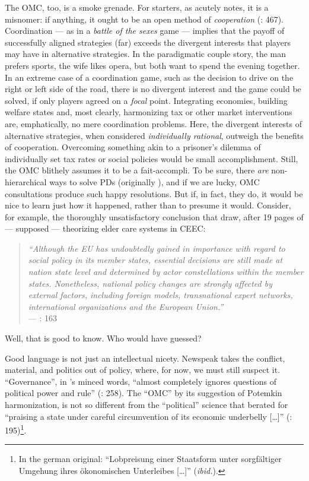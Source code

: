 \documentclass[11pt,a4paper,oneside,openright]{article}
\begin{document}
The \gls{OMC}, too, is a smoke grenade. For starters, as \citeauthor{Offe2003} acutely notes, it is a misnomer: if anything, it ought to be an open method of \emph{cooperation} (\citeyear{Offe2003}: 467). Coordination --- as in a \emph{battle of the sexes} game --- implies that the payoff of successfully aligned strategies (far) exceeds the divergent interests that players may have in alternative strategies. In the paradigmatic couple story, the man prefers sports, the wife likes opera, but both want to spend the evening together. In an extreme case of a coordination game, such as the decision to drive on the right or left side of the road, there is no divergent interest and the game could be solved, if only players agreed on a \emph{focal} point. Integrating economies, building welfare states and, most clearly, harmonizing tax or other market interventions are, emphatically, no mere coordination problems. Here, the divergent interests of alternative strategies, when considered \emph{individually rational}, outweigh the benefits of cooperation. Overcoming something akin to a prisoner's dilemma of individually set tax rates or social policies would be small accomplishment. Still, the \gls{OMC} blithely assumes it to be a fait-accompli. To be sure, there \emph{are} non-hierarchical ways to solve \glspl{PD} (originally \citealt{Axelrod1980}), and if we are lucky, \gls{OMC} consultations produce such happy resolutions. But if, in fact, they do, it would be nice to learn just how it happened, rather than to presume it would. 
Consider, for example, the thoroughly unsatisfactory conclusion that \citeauthor{Theobald2009} draw, after 19 pages of --- supposed --- theorizing elder care systems in \gls{CEEC}:
\begin{quote}
	\emph{``Although the EU has undoubtedly gained in importance with regard to social policy in its member states, essential decisions are still made at nation­ state level and determined by actor constellations within the member states. Nonetheless, national policy changes are strongly affected by external factors, including foreign models, transnational expert networks, international organizations and the European Union.''}\\
	--- \citeyear{Theobald2009}: 163
\end{quote}
Well, that is good to know. Who would have guessed?

Good language is not just an intellectual nicety. Newspeak takes the conflict, material, and politics out of policy, where, for now, we must still suspect it. ``Governance'', in \citeauthor{Jachtenfuchs2001}'s minced words, ``almost completely ignores questions of political power and rule'' (\citeyear{Jachtenfuchs2001}: 258). The ``\gls{OMC}'' by its suggestion of Potemkin harmonization, is not so different from the ``political'' science that \cite{Agnoli-1989-aa} berated for ``praising a state under careful circumvention of its economic underbelly [\ldots]'' (\citeyear{Agnoli-1989-aa}: 195)\footnote{
	In the german original: ``Lobpreisung einer Staatsform unter sorgf\"{a}ltiger Umgehung ihres \"{o}konomischen Unterleibes [\ldots]'' (\emph{ibid.}).}.
\end{document}
